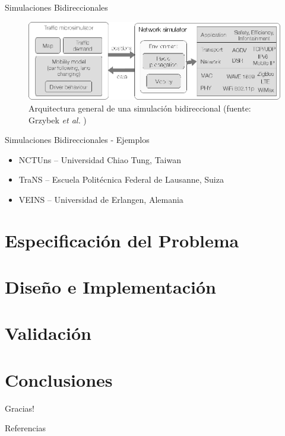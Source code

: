 \documentclass[aspectratio=169]{beamer}
\begin{document}
\begin{frame}{Simulaciones Bidireccionales}
\begin{figure}
    \centering
    \includegraphics[width=\textwidth]{figuras/bidirectionalsimul.png}
    \caption{Arquitectura general de una simulación bidireccional (fuente: Grzybek \emph{et al.} \autocite{trendsvanet2012})}
    \label{fig:bidirsimulation}
\end{figure}
\end{frame}

\begin{frame}{Simulaciones Bidireccionales - Ejemplos}
\begin{itemize}
    \item NCTUns -- Universidad Chiao Tung, Taiwan \autocite{nctuns6}
    \item TraNS -- Escuela Politécnica Federal de Lausanne, Suiza \autocite{piorkowski2008trans}
    \item VEINS -- Universidad de Erlangen, Alemania \autocite{sommer_german_dressler}
\end{itemize}
\end{frame}


    
\section{Especificación del Problema}
\section{Diseño e Implementación}
\section{Validación}
\section{Conclusiones}
\begin{frame}[standout]
Gracias!
\end{frame}

\begin{frame}[c,allowframebreaks]{Referencias}
\printbibliography[heading=none]
\end{frame}
\end{document}
